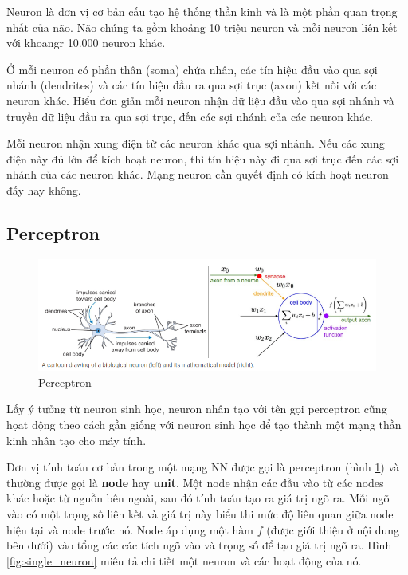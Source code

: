 Neuron là đơn vị cơ bản cấu tạo hệ thống thần kinh và là một phần quan trọng nhất của não. Não chúng ta gồm khoảng 10 triệu neuron và mỗi neuron liên kết với khoangr 10.000 neuron khác.

Ở mỗi neuron có phần thân (soma) chứa nhân, các tín hiệu đầu vào qua sợi nhánh (dendrites) và các tín hiệu đầu ra qua sợi trục (axon) kết nối với các neuron khác. Hiểu đơn giản mỗi neuron nhận dữ liệu đầu vào qua sợi nhánh và truyền dữ liệu đầu ra qua sợi trục, đến các sợi nhánh của các neuron khác.

Mỗi neuron nhận xung điện từ các neuron khác qua sợi nhánh. Nếu các xung điện này đủ lớn để kích hoạt neuron, thì tín hiệu này đi qua sợi trục đến các sợi nhánh của các neuron khác. Mạng neuron cần quyết định có kích hoạt neuron đấy hay không.


\subsection{Perceptron}
\label{s:perceptron}

\begin{figure}[htp]
\begin{center}
\includegraphics[scale=0.6]{chap2/c2_figs/perceptron.PNG}
\end{center}
\caption{Perceptron}
\label{fig:perceptron}
\end{figure}


Lấy ý tưởng từ neuron sinh học, neuron nhân tạo với tên gọi perceptron cũng họat động theo cách gần giống với neuron sinh học để tạo thành một mạng thần kinh nhân tạo cho máy tính.

Đơn vị tính toán cơ bản trong một mạng NN được gọi là perceptron (hình \ref{fig:perceptron}) và thường được gọi là \textbf{node} hay \textbf{unit}. Một node nhận các đầu vào từ các nodes khác hoặc từ nguồn bên ngoài, sau đó tính toán tạo ra giá trị ngõ ra. Mỗi ngõ vào có một trọng số liên kết và giá trị này biểu thi mức độ liên quan giữa node hiện tại và node trước nó. Node áp dụng một hàm $f$ (được giới thiệu ở nội dung bên dưới) vào tổng các các tích ngõ vào và trọng số để tạo giá trị ngõ ra. Hình \ref{fig:single_neuron} miêu tả chi tiết một neuron và các hoạt động của nó.

